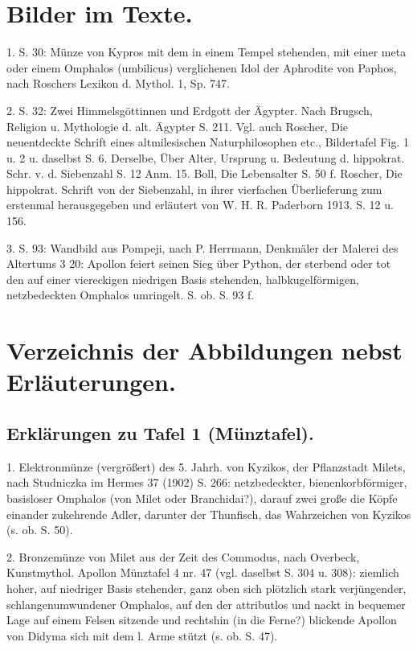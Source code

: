 \documentclass[a4paper, 11pt, oneside]{article}
\begin{document}
\section{Bilder im Texte.}

1. S. 30: Münze von Kypros mit dem in einem Tempel stehenden, mit einer meta oder einem Omphalos (umbilicus) verglichenen Idol der Aphrodite von Paphos, nach Roschers Lexikon d. Mythol. 1, Sp. 747.

2. S. 32: Zwei Himmelsgöttinnen und Erdgott der Ägypter. Nach Brugsch, Religion u. Mythologie d. alt. Ägypter S. 211. Vgl. auch Roscher, Die neuentdeckte Schrift eines altmilesischen Naturphilosophen etc., Bildertafel Fig. 1 u. 2 u. daselbst S. 6. Derselbe, Über Alter, Ursprung u. Bedeutung d. hippokrat. Schr. v. d. Siebenzahl S. 12 Anm. 15. Boll, Die Lebensalter S. 50 f. Roscher, Die hippokrat. Schrift von der Siebenzahl, in ihrer vierfachen Überlieferung zum erstenmal herausgegeben und erläutert von W. H. R. Paderborn 1913. S. 12 u. 156.

3. S. 93: Wandbild aus Pompeji, nach P. Herrmann, Denkmäler der Malerei des Altertums 3 20: Apollon feiert seinen Sieg über Python, der sterbend oder tot den auf einer viereckigen niedrigen Basis stehenden, halbkugelförmigen, netzbedeckten Omphalos umringelt. S. ob. S. 93 f.
\clearpage
\section{Verzeichnis der Abbildungen nebst Erläuterungen.}
\subsection{Erklärungen zu Tafel 1 (Münztafel).}

1. Elektronmünze (vergrößert) des 5. Jahrh. von Kyzikos, der Pflanzstadt Milets, nach Studniczka im Hermes 37 (1902) S. 266: netzbedeckter, bienenkorbförmiger, basisloser Omphalos (von Milet oder Branchidai?), darauf zwei große die Köpfe einander zukehrende Adler, darunter der Thunfisch, das Wahrzeichen von Kyzikos (s. ob. S. 50).

2. Bronzemünze von Milet aus der Zeit des Commodus, nach Overbeck, Kunstmythol. Apollon Münztafel 4 nr. 47 (vgl. daselbst S. 304 u. 308): ziemlich hoher, auf niedriger Basis stehender, ganz oben sich plötzlich stark verjüngender, schlangenumwundener Omphalos, auf den der attributlos und nackt in bequemer Lage auf einem Felsen sitzende und rechtshin (in die Ferne?) blickende Apollon von Didyma sich mit dem l. Arme stützt (s. ob. S. 47).
\end{document}
